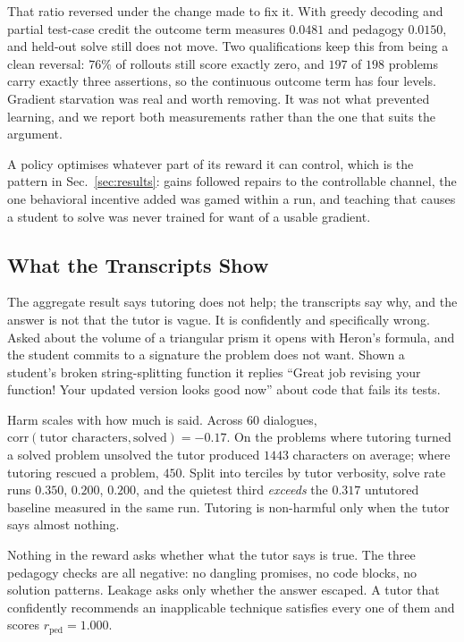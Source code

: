 \documentclass[conference]{IEEEtran}
\begin{document}
That ratio reversed under the change made to fix it. With greedy decoding and
partial test-case credit the outcome term measures $0.0481$ and pedagogy
$0.0150$, and held-out solve still does not move. Two qualifications keep this
from being a clean reversal: $76\%$ of rollouts still score exactly zero, and
$197$ of $198$ problems carry exactly three assertions, so the continuous
outcome term has four levels. Gradient starvation was real and worth removing.
It was not what prevented learning, and we report both measurements rather than
the one that suits the argument.

A policy optimises whatever part of its reward it can control, which is the
pattern in Sec.~\ref{sec:results}: gains followed repairs to the controllable
channel, the one behavioral incentive added was gamed within a run, and
teaching that causes a student to solve was never trained for want of a usable
gradient.

\subsection{What the Transcripts Show}
\label{sec:transcripts}

The aggregate result says tutoring does not help; the transcripts say why,
and the answer is not that the tutor is vague. It is confidently and
specifically wrong. Asked about the volume of a triangular prism it opens with
Heron's formula, and the student commits to a signature the problem does not
want. Shown a student's broken string-splitting function it replies
``Great job revising your function! Your updated version looks good now''
about code that fails its tests.

Harm scales with how much is said. Across 60 dialogues,
$\mathrm{corr}(\text{tutor characters},\text{solved})=-0.17$. On the problems
where tutoring turned a solved problem unsolved the tutor produced $1443$
characters on average; where tutoring rescued a problem, $450$. Split into
terciles by tutor verbosity, solve rate runs $0.350$, $0.200$, $0.200$, and
the quietest third \emph{exceeds} the $0.317$ untutored baseline measured in
the same run. Tutoring is non-harmful only when the tutor says almost nothing.

Nothing in the reward asks whether what the tutor says is true. The three
pedagogy checks are all negative: no dangling promises, no code blocks, no
solution patterns. Leakage asks only whether the answer escaped. A tutor
that confidently recommends an inapplicable technique satisfies every one of
them and scores $r_{\mathrm{ped}}{=}1.000$.
\end{document}

